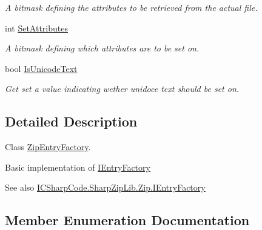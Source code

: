 \begin{DoxyCompactItemize}
\begin{DoxyCompactList}\small\item\em A bitmask defining the attributes to be retrieved from the actual file. \end{DoxyCompactList}\item 
int \hyperlink{class_i_c_sharp_code_1_1_sharp_zip_lib_1_1_zip_1_1_zip_entry_factory_a58b911c224133732012e8c91ab403a2f}{Set\+Attributes}
\begin{DoxyCompactList}\small\item\em A bitmask defining which attributes are to be set on. \end{DoxyCompactList}\item 
bool \hyperlink{class_i_c_sharp_code_1_1_sharp_zip_lib_1_1_zip_1_1_zip_entry_factory_a38a51c9551bb282aba689ba4c35d724c}{Is\+Unicode\+Text}
\begin{DoxyCompactList}\small\item\em Get set a value indicating wether unidoce text should be set on. \end{DoxyCompactList}\end{DoxyCompactItemize}


\subsection{Detailed Description}
Class \hyperlink{class_i_c_sharp_code_1_1_sharp_zip_lib_1_1_zip_1_1_zip_entry_factory}{Zip\+Entry\+Factory}. 

Basic implementation of \hyperlink{interface_i_c_sharp_code_1_1_sharp_zip_lib_1_1_zip_1_1_i_entry_factory}{I\+Entry\+Factory} 

\begin{DoxySeeAlso}{See also}
\hyperlink{interface_i_c_sharp_code_1_1_sharp_zip_lib_1_1_zip_1_1_i_entry_factory}{I\+C\+Sharp\+Code.\+Sharp\+Zip\+Lib.\+Zip.\+I\+Entry\+Factory}


\end{DoxySeeAlso}


\subsection{Member Enumeration Documentation}
\mbox{\label{class_i_c_sharp_code_1_1_sharp_zip_lib_1_1_zip_1_1_zip_entry_factory_a10d0f2a1e64abd09ea6abac4d34a9955}} 
